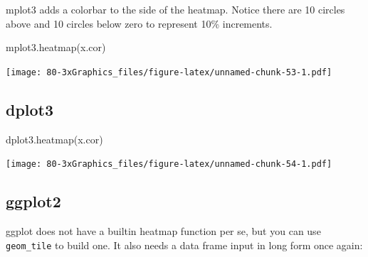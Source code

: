 \documentclass[
]{book}
\newenvironment{Shaded}{\begin{snugshade}}{\end{snugshade}}
\newcommand{\FunctionTok}[1]{\textcolor[rgb]{0.00,0.00,0.00}{#1}}
\newcommand{\NormalTok}[1]{#1}
\begin{document}
mplot3 adds a colorbar to the side of the heatmap. Notice there are 10 circles above and 10 circles below zero to represent 10\% increments.

\begin{Shaded}
\begin{Highlighting}[]
\FunctionTok{mplot3.heatmap}\NormalTok{(x.cor)}
\end{Highlighting}
\end{Shaded}

\texttt{[image: 80-3xGraphics\_files/figure-latex/unnamed-chunk-53-1.pdf]}

\hypertarget{dplot3-6}{%
\subsection{\texorpdfstring{\textbf{dplot3}}{dplot3}}\label{dplot3-6}}

\begin{Shaded}
\begin{Highlighting}[]
\FunctionTok{dplot3.heatmap}\NormalTok{(x.cor)}
\end{Highlighting}
\end{Shaded}

\texttt{[image: 80-3xGraphics\_files/figure-latex/unnamed-chunk-54-1.pdf]}

\hypertarget{ggplot2-7}{%
\subsection{\texorpdfstring{\textbf{ggplot2}}{ggplot2}}\label{ggplot2-7}}

ggplot does not have a builtin heatmap function per se, but you can use \texttt{geom\_tile} to build one. It also needs a data frame input in long form once again:
\end{document}
